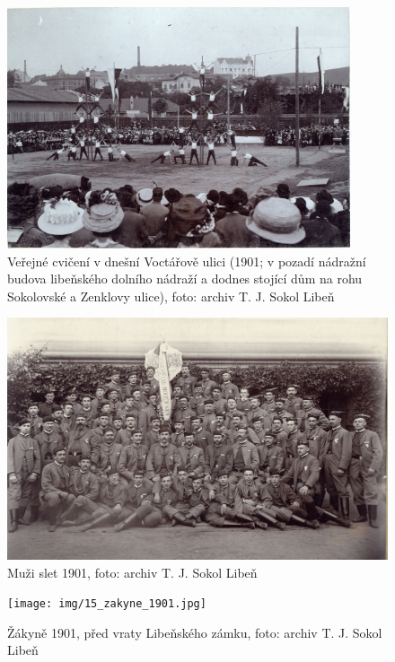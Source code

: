 \documentclass[a5paper, 11pt, twoside]{article}
\begin{document}
\begin{figure}[hp]
  \centering
  \includegraphics[width=0.9\textwidth]{img/13_verejne_cviceni.jpg}
  \caption*{Veřejné cvičení v dnešní Voctářově ulici (1901; v pozadí nádražní budova libeňského dolního nádraží a dodnes stojící dům na rohu Sokolovské a Zenklovy ulice), foto: archiv T. J. Sokol Libeň}
\end{figure}

\begin{figure}[hp]
  \centering
  \includegraphics[width=\textwidth]{img/14_muzi_slet_1901.jpg}
  \caption*{Muži slet 1901, foto: archiv T. J. Sokol Libeň}
\end{figure}

\begin{figure}[h!]
  \centering
  \texttt{[image: img/15\_zakyne\_1901.jpg]}
  \caption*{Žákyně 1901, před vraty Libeňského zámku, foto: archiv T. J. Sokol Libeň}
\end{figure}
\end{document}
